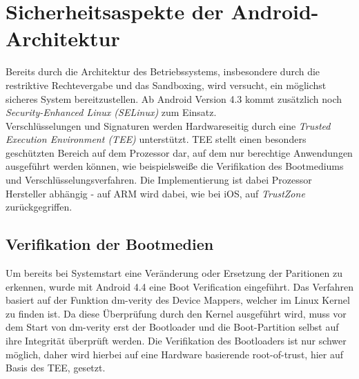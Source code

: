\section{Sicherheitsaspekte der Android-Architektur}

	Bereits durch die Architektur des Betriebssystems, insbesondere durch die restriktive Rechtevergabe und das Sandboxing, wird versucht, ein möglichst sicheres System bereitzustellen. Ab Android Version 4.3 kommt zusätzlich noch \textit{Security-Enhanced Linux (SELinux)} zum Einsatz.\\
	Verschlüsselungen und Signaturen werden Hardwareseitig durch eine \textit{Trusted Execution Environment (TEE)} unterstützt. TEE stellt einen besonders geschützten Bereich auf dem Prozessor dar, auf dem nur berechtige Anwendungen ausgeführt werden können, wie beispielsweiße die Verifikation des Bootmediums und Verschlüsselungsverfahren. Die Implementierung ist dabei Prozessor Hersteller abhängig - auf ARM wird dabei, wie bei iOS, auf \textit{TrustZone}\cite{TEE_ARM} zurückgegriffen.
	
	\subsection{Verifikation der Bootmedien} \label{sec:VerifikationDerBootmedien}
	Um bereits bei Systemstart eine Veränderung oder Ersetzung der Paritionen zu erkennen, wurde mit Android 4.4 eine Boot Verification eingeführt. Das Verfahren basiert auf der Funktion dm-verity des Device Mappers, welcher im Linux Kernel zu finden ist. Da diese Überprüfung durch den Kernel ausgeführt wird, muss vor dem Start von dm-verity erst der Bootloader und die Boot-Partition selbst auf ihre Integrität überprüft werden.
	Die Verifikation des Bootloaders ist nur schwer möglich, daher wird hierbei auf eine Hardware basierende root-of-trust, hier auf Basis des TEE, gesetzt. \\
	
